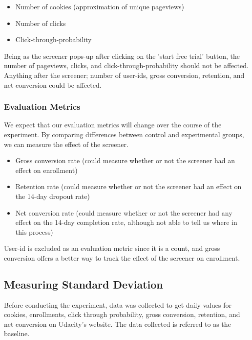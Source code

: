 \documentclass[paper=a4, fontsize=11pt]{scrartcl} %
\numberwithin{equation}{section} %
\numberwithin{figure}{section} %
\numberwithin{table}{section} %
\begin{document}
\begin{itemize}
	\item Number of cookies (approximation of unique pageviews)
	\item Number of clicks
	\item Click-through-probability
\end{itemize}

Being as the screener pops-up after clicking on the 'start free trial' button, the number of pageviews, clicks, and click-through-probability should not be affected.  Anything after the screener; number of user-id\textquotesingle s, gross conversion, retention, and net conversion could be affected.


\subsubsection{Evaluation Metrics}

We expect that our evaluation metrics will change over the course of the experiment.  By comparing differences between control and experimental groups, we can measure the effect of the screener.

\begin{itemize}
	\item Gross conversion rate (could measure whether or not the screener had an effect on enrollment)
	\item Retention rate (could measure whether or not the screener had an effect on the 14-day dropout rate)
	\item Net conversion rate (could measure whether or not the screener had any effect on the 14-day completion rate, although not able to tell us where in this process)
\end{itemize}

User-id is excluded as an evaluation metric since it is a count, and gross conversion offers a better way to track the effect of the screener on enrollment. \newline


\subsection{Measuring Standard Deviation}

Before conducting the experiment, data was collected to get daily values for cookies, enrollments, click through probability, gross conversion, retention, and net conversion on Udacity's website.  The data collected is referred to as the baseline. \newline
\end{document}

